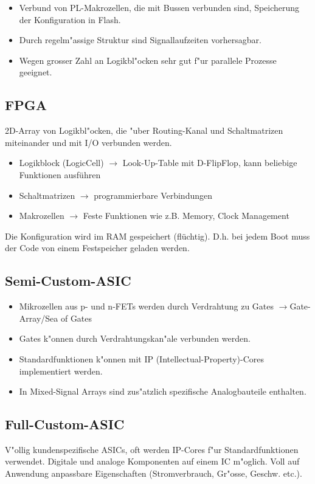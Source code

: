 \begin{scriptsize}
\begin{multicols}{2}
\begin{itemize}
	\item Verbund von PL-Makrozellen, die mit Bussen verbunden sind, Speicherung der Konfiguration in Flash.
	\item Durch regelm"assige Struktur sind Signallaufzeiten vorhersagbar.
	\item Wegen grosser Zahl an Logikbl"ocken sehr gut f"ur parallele Prozesse geeignet.
\end{itemize}
\vfill\null
\columnbreak
\subsection{FPGA}
2D-Array von Logikbl"ocken, die "uber Routing-Kanal und Schaltmatrizen miteinander und mit I/O verbunden werden.
\vspace{-\topsep}
\begin{itemize}
	\setlength{\itemsep}{1pt}
	\setlength{\parskip}{0pt}
	\setlength{\parsep}{0pt}
	
	\item Logikblock (LogicCell) $\rightarrow$ Look-Up-Table mit D-FlipFlop, kann beliebige Funktionen ausführen
	\item Schaltmatrizen $\rightarrow$ programmierbare Verbindungen
	\item Makrozellen $\rightarrow$ Feste Funktionen wie z.B. Memory, Clock Management
\end{itemize}
\vspace{-\topsep}
Die Konfiguration wird im RAM gespeichert (flüchtig). D.h. bei jedem Boot muss der Code von einem Festspeicher geladen werden.

\subsection{Semi-Custom-ASIC}
\begin{itemize}
	\setlength{\itemsep}{1pt}
	\setlength{\parskip}{0pt}
	\setlength{\parsep}{0pt}
	
	\item Mikrozellen aus p- und n-FETs werden durch Verdrahtung zu Gates 			
	$\rightarrow$Gate-Array/Sea of Gates
	\item Gates k"onnen durch Verdrahtungskan"ale verbunden werden.
	\item Standardfunktionen k"onnen mit IP (Intellectual-Property)-Cores implementiert werden.
	\item In Mixed-Signal Arrays sind zus"atzlich spezifische Analogbauteile enthalten.
\end{itemize}
\vspace{-\topsep}

\subsection{Full-Custom-ASIC}
V"ollig kundenspezifische ASICs, oft werden IP-Cores f"ur Standardfunktionen verwendet. Digitale und analoge Komponenten auf einem IC m"oglich. Voll auf Anwendung anpassbare Eigenschaften (Stromverbrauch, Gr"osse, Geschw. etc.).
\vfill\null
\end{multicols}
\end{scriptsize}

